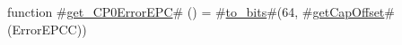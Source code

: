 function #\hyperref[zgetzyCP0ErrorEPC]{get\_CP0ErrorEPC}# () =
  #\hyperref[ztozybits]{to\_bits}#(64, #\hyperref[zgetCapOffset]{getCapOffset}#(ErrorEPCC))
